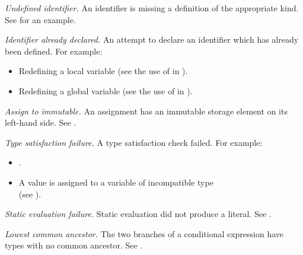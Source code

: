 \begin{description}

\hypertarget{def-undefinedidentifier}{}
\item[$\UndefinedIdentifier$]
  \textit{Undefined identifier.}
  An identifier is missing a definition of the appropriate kind.
  See  for an example.

\hypertarget{def-identifieralreadydeclared}{}
\item[$\IdentifierAlreadyDeclared$]
  \textit{Identifier already declared.}
  An attempt to declare an identifier which has already been defined.
  For example:
  \begin{itemize}
    \item Redefining a local variable (see the use of  in ).
    \item Redefining a global variable (see the use of  in ).
  \end{itemize}

\hypertarget{def-aim}{}
\item[$\AssignmentToImmutable$]
  \textit{Assign to immutable.}
  An assignment has an immutable storage element on its left-hand side.
  See .

\hypertarget{def-typesatisfactionfailure}{}
\item[$\TypeSatisfactionFailure$]
  \textit{Type satisfaction failure.}
  A type satisfaction check failed.
  For example:
  \begin{itemize}
    \item {}.
    \item A value is assigned to a variable of incompatible type \\ (see ).
  \end{itemize}

\hypertarget{def-staticevaluationfailure}{}
\item[$\StaticEvaluationFailure$]
  \textit{Static evaluation failure.}
  Static evaluation did not produce a literal.
  See .

\hypertarget{def-nolca}{}
\item[$\NoLCA$]
  \textit{Lowest common ancestor.}
  The two branches of a conditional expression have types with no common ancestor.
  See .


\end{description}

